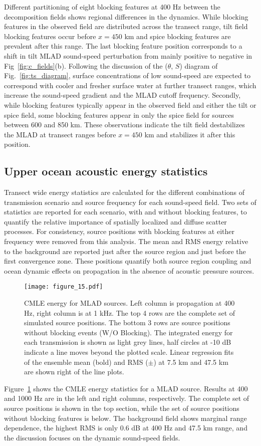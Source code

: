 \documentclass[preprint,NumberedRefs]{JASA}
\begin{document}
Different partitioning of eight blocking features at 400 Hz between the decomposition fields shows regional differences in the dynamics. While blocking features in the observed field are distributed across the transect range, tilt field blocking features occur before $x=450$ km and spice blocking features are prevalent after this range. The last blocking feature position corresponds to a shift in tilt MLAD sound-speed perturbation from mainly positive to negative in Fig~\ref{fig:c_fields}(b). Following the discussion of the ($\theta$, $S$) diagram of Fig.~\ref{fig:ts_diagram}, surface concentrations of low sound-speed are expected to correspond with cooler and fresher surface water at further transect ranges, which increase the sound-speed gradient and the MLAD cutoff frequency. Secondly, while blocking features typically appear in the observed field and either the tilt or spice field, some blocking features appear in only the spice field for sources between 600 and 850 km. These observations indicate the tilt field destabilizes the MLAD at transect ranges before $x=450$ km and stabilizes it after this position.

\subsection{Upper ocean acoustic energy statistics}\label{ssec:energy}
Transect wide energy statistics are calculated for the different combinations of transmission scenario and source frequency for each sound-speed field. Two sets of statistics are reported for each scenario, with and without blocking features, to quantify the relative importance of spatially localized and diffuse scatter processes. For consistency, source positions with blocking features at either frequency were removed from this analysis. The mean and RMS energy relative to the background are reported just after the source region and just before the first convergence zone. These positions quantify both source region coupling and ocean dynamic effects on propagation in the absence of acoustic pressure sources.

\begin{figure}
\texttt{[image: figure\_15.pdf]}
    \caption{CMLE energy for MLAD sources. Left column is propagation at 400 Hz, right column is at 1 kHz. The top 4 rows are the complete set of simulated source positions. The bottom 3 rows are source positions without blocking events (W/O Blocking). The integrated energy for each transmission is shown as light grey lines, half circles at -10 dB indicate a line moves beyond the plotted scale. Linear regression fits of the ensemble mean (bold) and RMS ($\pm$) at 7.5 km and 47.5 km are shown right of the line plots.}
    \label{fig:shal_eng}
\end{figure}
Figure~\ref{fig:shal_eng} shows the CMLE energy statistics for a MLAD source. Results at 400 and 1000 Hz are in the left and right columns, respectively. The complete set of source positions is shown in the top section, while the set of source positions without blocking features is below. The background field shows marginal range dependence, the highest RMS is only 0.6 dB at 400 Hz and 47.5 km range, and the discussion focuses on the dynamic sound-speed fields.
\end{document}
